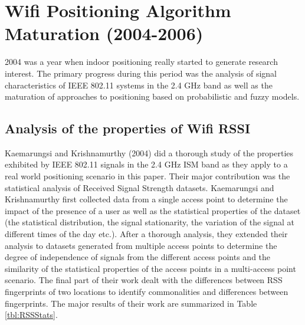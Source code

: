 \section{Wifi Positioning Algorithm Maturation (2004-2006)}

2004 was a year when indoor positioning really started to generate research interest. The primary progress during this period was the analysis of signal characteristics of IEEE 802.11 systems in the 2.4 GHz band as well as the maturation of approaches to positioning based on probabilistic and fuzzy models.

\subsection{Analysis of the properties of Wifi RSSI}

Kaemarungsi and Krishnamurthy\cite{KStats} (2004)  did a thorough study of the properties exhibited by IEEE 802.11 signals in the 2.4 GHz ISM band as they apply to a real world positioning scenario in this paper. Their major contribution was the statistical analysis of Received Signal Strength datasets. Kaemarungsi and Krishnamurthy first collected data from a single access point to determine the impact of the presence of a user as well as the statistical properties of the dataset (the statistical distribution, the signal stationarity, the variation of the signal at different times of the day etc.). After a thorough analysis, they extended their analysis to datasets generated from multiple access points to determine the degree of independence of signals from the different access points and the similarity of the statistical properties of the access points in a multi-access point scenario. The final part of their work dealt with the differences between RSS fingerprints of two locations to identify commonalities and differences between fingerprints. The major results of their work are summarized in Table \ref{tbl:RSSStats}.

